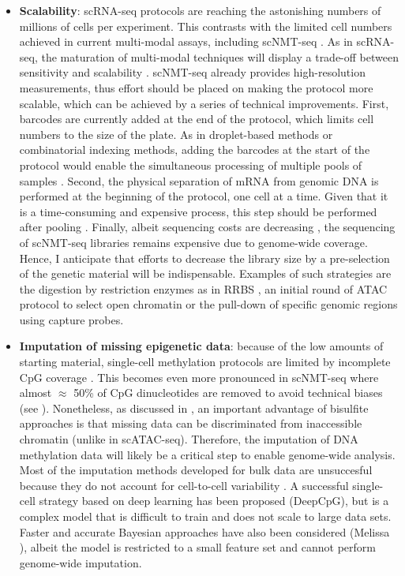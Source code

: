 \begin{itemize}

	\item \textbf{Scalability}: scRNA-seq protocols are reaching the astonishing numbers of millions of cells per experiment. This contrasts with the limited cell numbers achieved in current multi-modal assays, including scNMT-seq \cite{Cao2019,Cao2018,Guo2017}. As in scRNA-seq, the maturation of multi-modal techniques will display a trade-off between sensitivity and scalability \cite{Chappell2018}. scNMT-seq already provides high-resolution measurements, thus effort should be placed on making the protocol more scalable, which can be achieved by a series of technical improvements. First, barcodes are currently added at the end of the protocol, which limits cell numbers to the size of the plate. As in droplet-based methods or combinatorial indexing methods, adding the barcodes at the start of the protocol would enable the simultaneous processing of multiple pools of samples \cite{Dey2015,Mulqueen2018}. Second, the physical separation of mRNA from genomic DNA is performed at the beginning of the protocol, one cell at a time. Given that it is a time-consuming and expensive process, this step should be performed after pooling \cite{Dey2015}. Finally, albeit sequencing costs are decreasing \cite{Svensson2018}, the sequencing of scNMT-seq libraries remains expensive due to genome-wide coverage. Hence, I anticipate that efforts to decrease the library size by a pre-selection of the genetic material will be indispensable. Examples of such strategies are the digestion by restriction enzymes as in RRBS \cite{Guo2013}, an initial round of ATAC protocol to select open chromatin \cite{Spektor2018} or the pull-down of specific genomic regions using capture probes.

	\item \textbf{Imputation of missing epigenetic data}: because of the low amounts of starting material, single-cell methylation protocols are limited by incomplete CpG coverage \cite{Angermueller2017}. This becomes even more pronounced in scNMT-seq where almost $\approx$ 50\% of CpG dinucleotides are removed to avoid technical biases (see ). Nonetheless, as discussed in , an important advantage of bisulfite approaches is that missing data can be discriminated from inaccessible chromatin (unlike in scATAC-seq). Therefore, the imputation of DNA methylation data will likely be a critical step to enable genome-wide analysis. Most of the imputation methods developed for bulk data are unsuccesful because they do not account for cell-to-cell variability \cite{Angermueller2017}. A successful single-cell strategy based on deep learning has been proposed (DeepCpG\cite{Angermueller2017}), but is a complex model that is difficult to train and does not scale to large data sets. Faster and accurate Bayesian approaches have also been considered (Melissa \cite{Kapourani2018b}), albeit the model is restricted to a small feature set and cannot perform genome-wide imputation.


\end{itemize}
